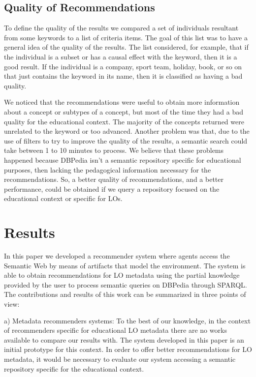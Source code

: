 \documentclass[a4paper,twoside]{article}
\begin{document}
\subsection{Quality of Recommendations}

\noindent To define the quality of the results we compared a set of individuals resultant from some keywords to a list of criteria items. The goal of this list was to have a general idea of the quality of the results. The list considered, for example, that if the individual is a subset or has a causal effect with the keyword, then it is a good result. If the individual is a company, sport team, holiday, book, or so on that just contains the keyword in its name, then it is classified as having a bad quality.

We noticed that the recommendations were useful to obtain more information about a concept or subtypes of a concept, but most of the time they had a bad quality for the educational context. The majority of the concepts returned were unrelated to the keyword or too advanced. Another problem was that, due to the use of filters to try to improve the quality of the results, a semantic search could take between 1 to 10 minutes to process. We believe that these problems happened because DBPedia isn't a semantic repository specific for educational purposes, then lacking the pedagogical information necessary for the recommendations. So, a better quality of recommendations, and a better performance, could be obtained if we query a repository focused on the educational context or specific for LOs.


\section{Results}
\noindent In this paper we developed a recommender system where agents access the Semantic Web by means of artifacts that model the environment. The system is able to obtain recommendations for LO metadata using the partial knowledge provided by the user to process semantic queries on DBPedia through SPARQL. The contributions and results of this work can be summarized in three points of view:

a) Metadata recommenders systems: To the best of our knowledge, in the context of recommenders specific for educational LO metadata there are no works available to compare our results with. The system developed in this paper is an initial prototype for this context. In order to offer better recommendations for LO metadata, it would be necessary to evaluate our system accessing a semantic repository specific for the educational context.
\end{document}
